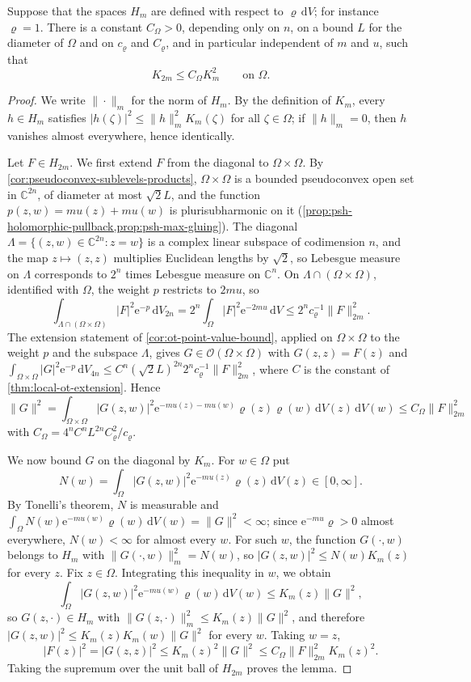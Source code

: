\begin{lemma}\label{lem:bergman-diagonal-comparison}
Suppose that the spaces $H_m$ are defined with respect to $\varrho\,\mathrm dV$; for instance $\varrho=1$. There is a constant $C_\Omega>0$, depending only on $n$, on a bound $L$ for the diameter of $\Omega$ and on $c_\varrho$ and $C_\varrho$, and in particular independent of $m$ and $u$, such that
\[
 K_{2m}\leq C_\Omega K_m^2\qquad\text{on }\Omega.
\]
\end{lemma}
\begin{proof}
We write $\|\cdot\|_m$ for the norm of $H_m$. By the definition of $K_m$, every $h\in H_m$ satisfies $|h(\zeta)|^2\leq\|h\|_m^2K_m(\zeta)$ for all $\zeta\in\Omega$; if $\|h\|_m=0$, then $h$ vanishes almost everywhere, hence identically.

Let $F\in H_{2m}$. We first extend $F$ from the diagonal to $\Omega\times\Omega$. By \cref{cor:pseudoconvex-sublevels-products}, $\Omega\times\Omega$ is a bounded pseudoconvex open set in $\mathbb C^{2n}$, of diameter at most $\sqrt2L$, and the function $p(z,w)=mu(z)+mu(w)$ is plurisubharmonic on it (\cref{prop:psh-holomorphic-pullback,prop:psh-max-gluing}). The diagonal $\Lambda=\{(z,w)\in\mathbb C^{2n}:z=w\}$ is a complex linear subspace of codimension $n$, and the map $z\mapsto(z,z)$ multiplies Euclidean lengths by $\sqrt2$, so Lebesgue measure on $\Lambda$ corresponds to $2^n$ times Lebesgue measure on $\mathbb C^n$. On $\Lambda\cap(\Omega\times\Omega)$, identified with $\Omega$, the weight $p$ restricts to $2mu$, so
\[
 \int_{\Lambda\cap(\Omega\times\Omega)}|F|^2\mathrm e^{-p}\,\mathrm dV_{2n}=2^n\int_\Omega|F|^2\mathrm e^{-2mu}\,\mathrm dV\leq2^nc_\varrho^{-1}\|F\|_{2m}^2.
\]
The extension statement of \cref{cor:ot-point-value-bound}, applied on $\Omega\times\Omega$ to the weight $p$ and the subspace $\Lambda$, gives $G\in\mathcal O(\Omega\times\Omega)$ with $G(z,z)=F(z)$ and $\int_{\Omega\times\Omega}|G|^2\mathrm e^{-p}\,\mathrm dV_{4n}\leq C^n(\sqrt2L)^{2n}2^nc_\varrho^{-1}\|F\|_{2m}^2$, where $C$ is the constant of \cref{thm:local-ot-extension}. Hence
\[
 \|G\|^2=\int_{\Omega\times\Omega}|G(z,w)|^2\mathrm e^{-mu(z)-mu(w)}\varrho(z)\varrho(w)\,\mathrm dV(z)\,\mathrm dV(w)\leq C_\Omega\|F\|_{2m}^2
\]
with $C_\Omega=4^nC^nL^{2n}C_\varrho^2/c_\varrho$.

We now bound $G$ on the diagonal by $K_m$. For $w\in\Omega$ put
\[
 N(w)=\int_\Omega|G(z,w)|^2\mathrm e^{-mu(z)}\varrho(z)\,\mathrm dV(z)\in[0,\infty].
\]
By Tonelli's theorem, $N$ is measurable and $\int_\Omega N(w)\mathrm e^{-mu(w)}\varrho(w)\,\mathrm dV(w)=\|G\|^2<\infty$; since $\mathrm e^{-mu}\varrho>0$ almost everywhere, $N(w)<\infty$ for almost every $w$. For such $w$, the function $G(\cdot,w)$ belongs to $H_m$ with $\|G(\cdot,w)\|_m^2=N(w)$, so $|G(z,w)|^2\leq N(w)K_m(z)$ for every $z$. Fix $z\in\Omega$. Integrating this inequality in $w$, we obtain
\[
 \int_\Omega|G(z,w)|^2\mathrm e^{-mu(w)}\varrho(w)\,\mathrm dV(w)\leq K_m(z)\|G\|^2,
\]
so $G(z,\cdot)\in H_m$ with $\|G(z,\cdot)\|_m^2\leq K_m(z)\|G\|^2$, and therefore $|G(z,w)|^2\leq K_m(z)K_m(w)\|G\|^2$ for every $w$. Taking $w=z$,
\[
 |F(z)|^2=|G(z,z)|^2\leq K_m(z)^2\|G\|^2\leq C_\Omega\|F\|_{2m}^2K_m(z)^2.
\]
Taking the supremum over the unit ball of $H_{2m}$ proves the lemma.
\end{proof}
